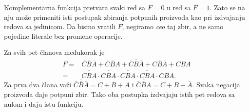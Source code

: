 
Komplementarna funkcija pretvara svaki red sa \(F=0\) u red sa \(\bar F=1\). Zato se na nju može primeniti isti postupak zbiranja potpunih proizvoda kao pri izdvajanju redova sa jedinicom. Da bismo vratili \(F\), negiramo \emph{ceo} taj zbir, a ne samo pojedine literale bez promene operacije.

Za svih pet članova međukorak je
\[
\begin{aligned}
F={}&\overline{\bar C\bar B\bar A+\bar C\bar BA+\bar CB\bar A+C\bar B\bar A+CBA}\\
={}&\overline{\bar C\bar B\bar A}\cdot\overline{\bar C\bar BA}\cdot\overline{\bar CB\bar A}
 \cdot\overline{C\bar B\bar A}\cdot\overline{CBA}.
\end{aligned}
\]
Za prva dva člana važi \(\overline{\bar C\bar B\bar A}=C+B+A\) i \(\overline{\bar C\bar BA}=C+B+\bar A\). Svaka negacija proizvoda daje potpuni zbir. Tako oba postupka izdvajaju istih pet redova sa nulom i daju istu funkciju.

